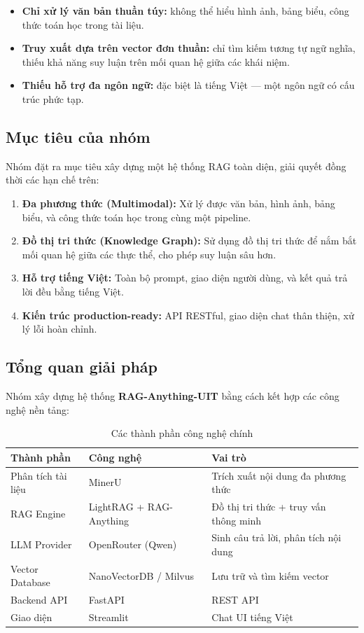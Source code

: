\documentclass[12pt,a4paper]{article}
\begin{document}
\begin{itemize}
  \item \textbf{Chỉ xử lý văn bản thuần túy:} không thể hiểu hình ảnh, bảng biểu, công thức toán học trong tài liệu.
  \item \textbf{Truy xuất dựa trên vector đơn thuần:} chỉ tìm kiếm tương tự ngữ nghĩa, thiếu khả năng suy luận trên mối quan hệ giữa các khái niệm.
  \item \textbf{Thiếu hỗ trợ đa ngôn ngữ:} đặc biệt là tiếng Việt --- một ngôn ngữ có cấu trúc phức tạp.
\end{itemize}

\subsection{Mục tiêu của nhóm}

Nhóm đặt ra mục tiêu xây dựng một hệ thống RAG toàn diện, giải quyết đồng thời các hạn chế trên:

\begin{enumerate}
  \item \textbf{Đa phương thức (Multimodal):} Xử lý được văn bản, hình ảnh, bảng biểu, và công thức toán học trong cùng một pipeline.
  \item \textbf{Đồ thị tri thức (Knowledge Graph):} Sử dụng đồ thị tri thức để nắm bắt mối quan hệ giữa các thực thể, cho phép suy luận sâu hơn.
  \item \textbf{Hỗ trợ tiếng Việt:} Toàn bộ prompt, giao diện người dùng, và kết quả trả lời đều bằng tiếng Việt.
  \item \textbf{Kiến trúc production-ready:} API RESTful, giao diện chat thân thiện, xử lý lỗi hoàn chỉnh.
\end{enumerate}

\subsection{Tổng quan giải pháp}

Nhóm xây dựng hệ thống \textbf{RAG-Anything-UIT} bằng cách kết hợp các công nghệ nền tảng:

\begin{table}[H]
\centering
\caption{Các thành phần công nghệ chính}
\begin{tabular}{lll}
\toprule
\textbf{Thành phần} & \textbf{Công nghệ} & \textbf{Vai trò} \\
\midrule
Phân tích tài liệu & MinerU & Trích xuất nội dung đa phương thức \\
RAG Engine & LightRAG + RAG-Anything & Đồ thị tri thức + truy vấn thông minh \\
LLM Provider & OpenRouter (Qwen) & Sinh câu trả lời, phân tích nội dung \\
Vector Database & NanoVectorDB / Milvus & Lưu trữ và tìm kiếm vector \\
Backend API & FastAPI & REST API \\
Giao diện & Streamlit & Chat UI tiếng Việt \\
\bottomrule
\end{tabular}
\end{table}
\end{document}
